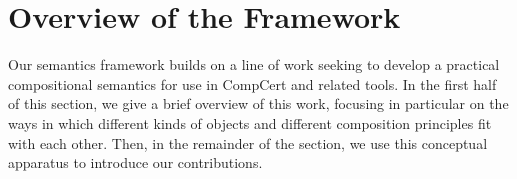 \documentclass[acmsmall,screen,review,anonymous]{acmart}
\begin{document}
%
%
%
%
%
%
%
%


\section{Overview of the Framework} %

Our semantics framework builds on a line of work
seeking to develop a practical compositional semantics
for use in CompCert and related tools.
In the first half of this section,
we give a brief overview of this work,
focusing in particular
on the ways in which
different kinds of objects and
different composition principles
fit with each other.
Then, in the remainder of the section,
we use this conceptual apparatus
to introduce our contributions.
\end{document}

